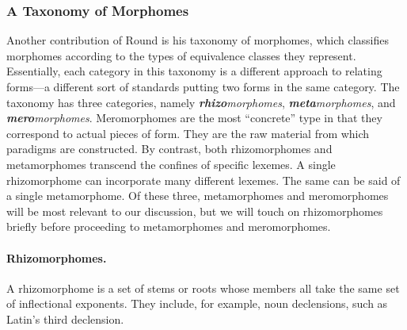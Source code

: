 \subsubsection{A Taxonomy of Morphomes}
Another contribution of Round is his taxonomy of morphomes, which 
classifies morphomes according to the types of equivalence classes they represent. 
Essentially, each category in this taxonomy is a different approach to relating forms---a different sort of standards putting two forms in the same category. %
The taxonomy has three categories, namely 
\textit{\textbf{rhizo}morphomes}, \textit{\textbf{meta}morphomes}, 
and \textit{\textbf{mero}morphomes}. Meromorphomes are the most ``concrete'' type in that they correspond to actual 
pieces of form. They are the raw material from which paradigms are constructed. 
By contrast, both rhizomorphomes and metamorphomes transcend the confines of specific lexemes. A single rhizomorphome can incorporate many different lexemes. The same can be said of a single metamorphome. 
Of these three, metamorphomes and meromorphomes will be most 
relevant to our discussion, but we will touch on rhizomorphomes briefly 
before proceeding to metamorphomes and meromorphomes.

\paragraph{Rhizomorphomes.} A rhizomorphome is a set of stems or roots
 whose members all take the same set of inflectional exponents. They include, for example,
 noun declensions, such as Latin's third declension.

